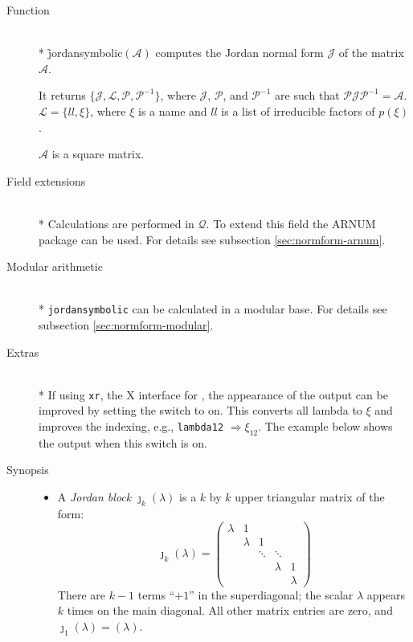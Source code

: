 \begin{description}
\item[Function]\mbox{}\\*
\f{jordansymbolic}$(\mathcal{A})$ computes the Jordan 
normal form $\mathcal{J}$ of the matrix $\mathcal{A}$.

It returns $\{\mathcal{J}, \mathcal{L}, \mathcal{P}, \mathcal{P}^{-1}\}$, where 
$\mathcal{J}$, $\mathcal{P}$, and $\mathcal{P}^{-1}$ are such that $\mathcal{P J P}^
{-1} = \mathcal{A}$. $\mathcal{L} = \{ ll , \xi \}$, where $\xi$ is 
a name and $ll$ is a list of irreducible factors of $p(\xi)$.

$\mathcal{A}$ is a square matrix.

\item[Field extensions]\mbox{}\\*
Calculations are performed in $\mathcal{Q}$. To extend this field the 
{\small ARNUM} package can be used. For details see subsection \ref{sec:normform-arnum}.

\item[Modular arithmetic]\mbox{}\\*
{\tt jordansymbolic} can be calculated in a modular base. For details 
see subsection \ref{sec:normform-modular}.

\item[Extras]\mbox{}\\*
\hypertarget{switch:LOOKING_GOOD}{}
If using \texttt{xr}, the X interface for \REDUCE, the appearance of the 
output can be improved by setting the switch  to on. This 
converts all lambda to $\xi$ and improves the indexing, e.g., \texttt{lambda12} 
$\Rightarrow \xi_{12}$. The example below shows the 
output when this switch is on.

\item[Synopsis]

\begin{itemize}
\item A \emph{Jordan block} ${\jmath}_{k}(\lambda)$ is a $k$ by $k$ 
      upper triangular matrix of the form:
%
      \begin{displaymath}
      {\jmath}_{k}(\lambda) = \begin{pmatrix} \lambda & 1 
      &  &  & \\  &  \lambda & 1  & & \\ & 
      & \ddots & \ddots & \\ &  &  &  \lambda & 1 \\ &
      &  &  & \lambda \end{pmatrix} 
      \end{displaymath}
%     
      There are $k-1$ terms ``$+1$'' in the superdiagonal; the scalar 
      $\lambda$ appears $k$ times on the main diagonal. All other 
      matrix entries are zero, and ${\jmath}_{1}(\lambda) = (\lambda)$.


\end{itemize}
\end{description}
